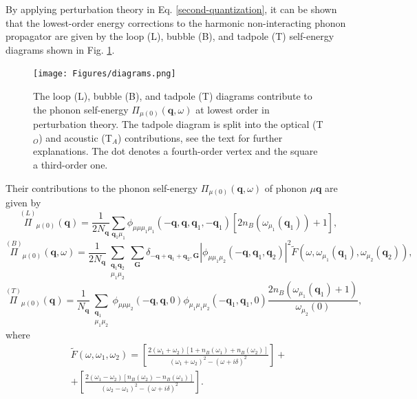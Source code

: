By applying perturbation theory in Eq. \ref{second-quantization}, it can be shown that the lowest-order energy corrections to the harmonic non-interacting phonon propagator are given by the loop (L), bubble (B), and tadpole (T) 
self-energy diagrams\cite{rousseau2010giant,calandra2007anharmonic} shown in Fig. \ref{diagram}.
\begin{figure}[h]
\begin{center}
\texttt{[image: Figures/diagrams.png]}
\caption{The loop (L), bubble (B), and tadpole (T) diagrams contribute to the phonon self-energy $\Pi_{\mu(0)}(\mathbf{q},\omega)$ at lowest order in perturbation theory. The tadpole diagram is split into the optical (T$_{O}$) and 
acoustic (T$_{A}$) contributions, see the text for further explanations. The dot denotes a fourth-order vertex and the square a third-order one.}
\label{diagram}
\end{center}
\end{figure}
Their contributions to the phonon self-energy $\Pi_{\mu(0)}(\mathbf{q},\omega)$ of phonon $\mu\mathbf{q}$ are given by
\begin{equation}
 \label{loop-diagram}
 \overset{(L)}{\Pi}_{\mu(0)}(\mathbf{q})=\frac{1}{2N_{\mathbf{q}}}\sum_{\mathbf{q}_{1}\mu_{1}}\phi_{\mu\mu\mu_{1}\mu_{1}}(-\mathbf{q},\mathbf{q},\mathbf{q}_{1},-\mathbf{q}_{1})[2n_{B}(\omega_{\mu_{1}}(\mathbf{q}_{1}))+1],
\end{equation}
\begin{equation}
 \label{bubble-diagram}
 \overset{(B)}{\Pi}_{\mu(0)}(\mathbf{q},\omega)=\frac{1}{2N_{\mathbf{q}}}\sum\limits_{\substack{\mathbf{q}_{1}\mathbf{q}_{2} \\ \mu_{1}\mu_{2}}}\sum_{\mathbf{G}}\delta_{-\mathbf{q}+\mathbf{q}_{1}+\mathbf{q}_{2},\mathbf{
 G}}|\phi_{\mu\mu_{1}\mu_{2}}(-\mathbf{q},\mathbf{q}_{1},\mathbf{q}_{2})|^{2}\tilde{F}(\omega,\omega_{\mu_{1}}(\mathbf{q}_{1}),\omega_{\mu_{2}}(\mathbf{q}_{2})),
\end{equation}
\begin{equation}
 \label{tadpole-diagram}
 \overset{(T)}{\Pi}_{\mu(0)}(\mathbf{q})=\frac{1}{N_{\mathbf{q}}}\sum\limits_{\substack{\mathbf{q}_{1} \\ \mu_{1}\mu_{2}}}\phi_{\mu\mu\mu_{2}}(-\mathbf{q},\mathbf{q},0)\phi_{\mu_{1}\mu_{1}\mu_{2}}(-\mathbf{q}_{1},\mathbf{q}_{1},
 0)\frac{2n_{B}(\omega_{\mu_{1}}(\mathbf{q}_{1})+1)}{\omega_{\mu_{2}}(0)},
\end{equation}
where
\begin{multline}
 \label{ftilde}
 \tilde{F}(\omega,\omega_{1},\omega_{2})=\left[\frac{2(\omega_{1}+\omega_{2})[1+n_{B}(\omega_{1})+n_{B}(\omega_{2})]}{(\omega_{1}+\omega_{2})^{2}-(\omega+i\delta)^{2}}\right]+ \\ 
 + \left[\frac{2(\omega_{1}-\omega_{2})[n_{B}(\omega_{2})-n_{B}(\omega_{1})]}{(\omega_{2}-\omega_{1})^{2}-(\omega+i\delta)^{2}}\right].
\end{multline}
